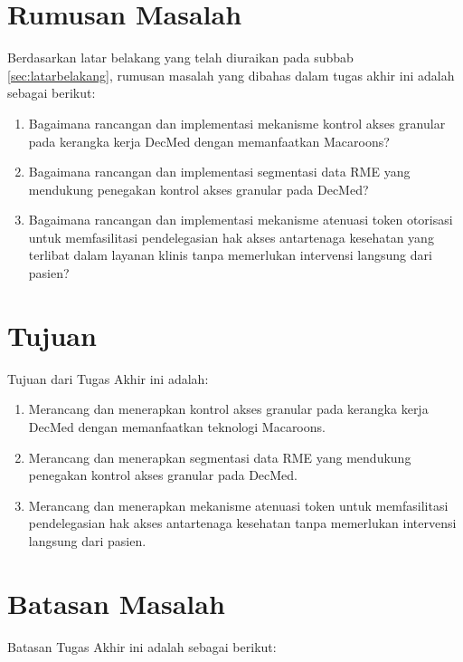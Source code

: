 \documentclass[bahasa, 12pt, a4paper, onecolumn, oneside, final]{report}
\begin{document}
\section{Rumusan Masalah}
\label{sec:rumusan-masalah}

Berdasarkan latar belakang yang telah diuraikan pada subbab \ref{sec:latarbelakang}, rumusan masalah yang dibahas dalam tugas akhir ini adalah sebagai berikut:

\begin{enumerate}
	\item Bagaimana rancangan dan implementasi mekanisme kontrol akses granular pada kerangka kerja DecMed dengan memanfaatkan Macaroons?
	\item Bagaimana rancangan dan implementasi segmentasi data RME yang mendukung penegakan kontrol akses granular pada DecMed?
	\item Bagaimana rancangan dan implementasi mekanisme atenuasi token otorisasi untuk memfasilitasi pendelegasian hak akses antartenaga kesehatan yang terlibat dalam layanan klinis tanpa memerlukan intervensi langsung dari pasien?
\end{enumerate}

\section{Tujuan}

Tujuan dari Tugas Akhir ini adalah:
\begin{enumerate}
	\item Merancang dan menerapkan kontrol akses granular pada kerangka kerja DecMed dengan memanfaatkan teknologi Macaroons.
	\item Merancang dan menerapkan segmentasi data RME yang mendukung penegakan kontrol akses granular pada DecMed.
	\item Merancang dan menerapkan mekanisme atenuasi token untuk memfasilitasi pendelegasian hak akses antartenaga kesehatan tanpa memerlukan intervensi langsung dari pasien.
\end{enumerate}

\section{Batasan Masalah}

Batasan Tugas Akhir ini adalah sebagai berikut:
\end{document}
